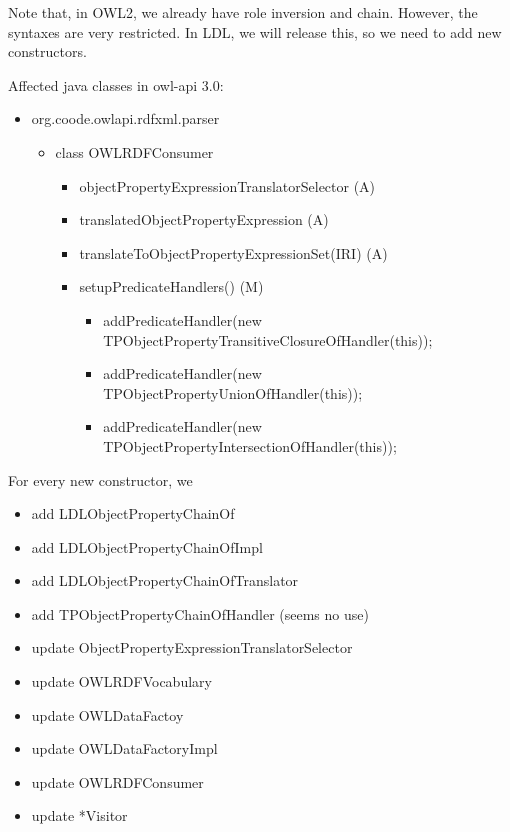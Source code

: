 \documentclass{article}
\begin{document}
 Note that, in OWL2, we already have role inversion
and chain. 
 However, the syntaxes are very restricted. 
 In LDL, we
will release this, so we need to add new constructors.
 
 Affected
java classes in owl-api 3.0:
 
\begin{itemize}
\item org.coode.owlapi.rdfxml.parser
  \begin{itemize}
  \item class OWLRDFConsumer 
    \begin{itemize}
    \item objectPropertyExpressionTranslatorSelector (A)
    \item translatedObjectPropertyExpression (A)
    \item translateToObjectPropertyExpressionSet(IRI) (A)
    \item setupPredicateHandlers() (M)
      \begin{itemize}
      \item addPredicateHandler(new
        TPObjectPropertyTransitiveClosureOfHandler(this));
      \item addPredicateHandler(new
        TPObjectPropertyUnionOfHandler(this));
      \item addPredicateHandler(new
        TPObjectPropertyIntersectionOfHandler(this));
 
      \end{itemize}
    \end{itemize}
  \end{itemize}
\end{itemize}
 
 

For every new constructor, we

\begin{itemize}

\item add LDLObjectPropertyChainOf
\item add LDLObjectPropertyChainOfImpl
\item add LDLObjectPropertyChainOfTranslator 
\item add TPObjectPropertyChainOfHandler (seems no use)
\item update ObjectPropertyExpressionTranslatorSelector
\item update OWLRDFVocabulary
\item update OWLDataFactoy
\item update OWLDataFactoryImpl
\item update OWLRDFConsumer 
\item update *Visitor
\end{itemize}
\end{document}

